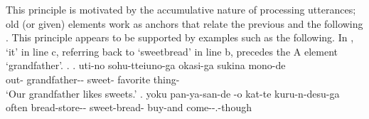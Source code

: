 This principle is motivated by the accumulative nature of processing utterances;
old (or given) elements work as anchors that relate
the previous  and the following .
This principle appears to be supported by examples such as the following.
%
In \Next,
 `it' in line c, referring back to  `sweetbread' in line b, precedes the A element  `grandfather'.
%
\ex. \label{PronIni1}
 \ag. uti-no sohu-tteiuno-ga okasi-ga sukina mono-de \\
 		out- grandfather-- sweet- favorite thing- \\
		`Our grandfather likes sweets.'
 \bg. yoku pan-ya-san-de -o kat-te kuru-n-desu-ga \\
   often bread-store-- sweet-bread- buy-and come--.-though \\
